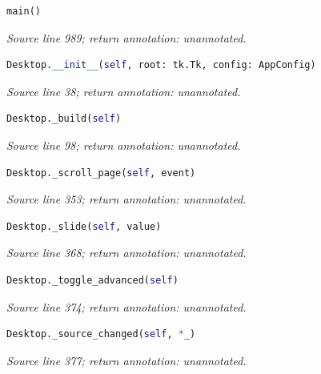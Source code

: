 

\begin{lstlisting}[language=Python]
main()
\end{lstlisting}


{\small \textit{Source line 989; return annotation: unannotated.}}



\begin{lstlisting}[language=Python]
Desktop.__init__(self, root: tk.Tk, config: AppConfig)
\end{lstlisting}


{\small \textit{Source line 38; return annotation: unannotated.}}



\begin{lstlisting}[language=Python]
Desktop._build(self)
\end{lstlisting}


{\small \textit{Source line 98; return annotation: unannotated.}}



\begin{lstlisting}[language=Python]
Desktop._scroll_page(self, event)
\end{lstlisting}


{\small \textit{Source line 353; return annotation: unannotated.}}



\begin{lstlisting}[language=Python]
Desktop._slide(self, value)
\end{lstlisting}


{\small \textit{Source line 368; return annotation: unannotated.}}



\begin{lstlisting}[language=Python]
Desktop._toggle_advanced(self)
\end{lstlisting}


{\small \textit{Source line 374; return annotation: unannotated.}}



\begin{lstlisting}[language=Python]
Desktop._source_changed(self, *_)
\end{lstlisting}


{\small \textit{Source line 377; return annotation: unannotated.}}

